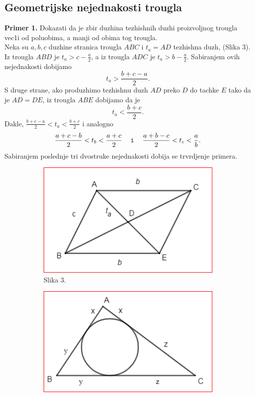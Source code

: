\documentclass[11pt,letter]{report}
\newcommand{\D}{\displaystyle}
\begin{document}
\begin{large}
\begin{flushleft}
\vspace*{-1.3in}
\section*{\centering \huge \textbf{Geometrijske nejednakosti trougla}}
\textbf{Primer 1.} Dokazati da je zbir duzhina tezhishnih duzhi proizvoljnog trougla vec1i od poluobima, a manji od obima tog trougla.\\

\vspace{0.2in}
Neka su $a, b, c$ duzhine stranica trougla $ABC$ i $t_a=AD$ tezhishna duzh, (Slika 3). Iz trougla $ABD$ je $\D t_a>c-\frac{a}{2}$, a iz trougla $ADC$ je $\D t_a>b-\frac{a}{2}$. Sabiranjem ovih nejednakosti dobijamo $$t_a>\frac{b+c-a}{2}.$$S druge strane, ako produzhimo tezhishnu duzh $AD$ preko $D$ do tachke $E$ tako da je $AD=DE$, iz trougla $ABE$ dobijamo da je $$t_a<\frac{b+c}{2}.$$
Dakle, $\D\frac{b+c-a}{2}<t_a<\frac{b+c}{2}$ i analogno\\
$$\D\frac{a+c-b}{2}<t_b<\frac{a+c}{2} \texttt{ \, i \,  } \D\frac{a+b-c}{2}<t_c<\frac{a}{b}.$$
Sabiranjem poslednje tri dvostruke nejednakosti dobija se trvrdjenje primera.
\vspace{0.5cm}
\begin{figure}[h!]
\begin{subfigure}{0.31\textwidth}
\includegraphics[width=\linewidth]{Slike/Slika3}
\caption*{Slika 3.} 
\end{subfigure}
\hspace*{\fill}
\begin{subfigure}{0.31\textwidth}
\includegraphics[width=\linewidth]{Slike/Slika4}

\end{subfigure}
\end{figure}
\end{flushleft}
\end{large}
\end{document}
